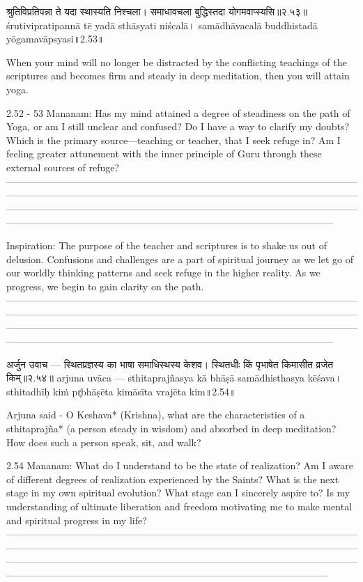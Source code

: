 श्रुतिविप्रतिपन्ना ते यदा स्थास्यति निश्चला। 
समाधावचला बुद्धिस्तदा योगमवाप्स्यसि॥२.५३॥
śrutivipratipannā tē yadā sthāsyati niścalā। 
samādhāvacalā buddhistadā yōgamavāpsyasi॥2.53॥

When your mind will no longer be distracted by the conflicting teachings of the scriptures and becomes firm and steady in deep meditation, then you will attain yoga. 

2.52 - 53 Mananam:
Has my mind attained a degree of steadiness on the path of Yoga, or am I still unclear and confused? Do I have a way to clarify my doubts? Which is the primary source—teaching or teacher, that I seek refuge in? Am I feeling greater attunement with the inner principle of Guru through these external sources of refuge?
—--------------------------------------------------------------------------------------------------------------------------------------------------------------------------------------------------------------------------------------------------------------------------------------------------------------------------------------------------------------------------------------------------------------------------------------
 
Inspiration:
The purpose of the teacher and scriptures is to shake us out of delusion. Confusions and challenges are a part of spiritual journey as we let go of our worldly thinking patterns and seek refuge in the higher reality. As we progress, we begin to gain clarity on the path.
—--------------------------------------------------------------------------------------------------------------------------------------------------------------------------------------------------------------------------------------------------------------------------------------------------------------------------------------------------------------------------------------------------------------------------------------

अर्जुन उवाच —
स्थितप्रज्ञस्य का भाषा समाधिस्थस्य केशव। 
स्थितधीः किं पृभाषेत किमासीत व्रजेत किम्॥२.५४॥
arjuna uvāca —
sthitaprajñasya kā bhāṣā samādhisthasya kēśava। 
sthitadhīḥ kiṁ pr̥bhāṣēta kimāsīta vrajēta kim॥2.54॥

Arjuna said -
O Keshava* (Krishna), what are the characteristics of a sthitaprajña* (a person steady in wisdom) and absorbed in deep meditation? How does such a person speak, sit, and walk? 

2.54 Mananam:
What do I understand to be the state of realization? Am I aware of different degrees of realization experienced by the Saints? What is the next stage in my own spiritual evolution? What stage can I sincerely aspire to? Is my understanding of ultimate liberation and freedom motivating me to make mental and spiritual progress in my life?
—------------------------------------------------------------------------------------------------------------------------------------------------------------------------------------------------------------------------------------------------------------------------------------------------------------------------------------------------------------------------------------------------------------------------------------

